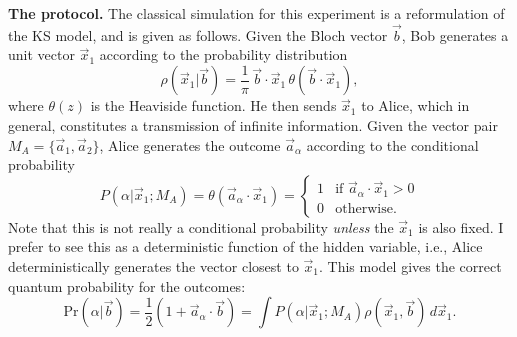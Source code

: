 \documentclass[12pt,draft]{article}
\theoremstyle{definition}
\theoremstyle{plain}
\begin{document}
    \textbf{The protocol.} The classical simulation for this
    experiment is a reformulation of the KS model, and is
    given as follows.  Given the Bloch vector $\vec b$, Bob
    generates a unit vector $\vec x_1$ according to the
    probability distribution
    \begin{equation}
        \rho(\vec x_1 | \vec b)
        = \frac{1}{\pi} \, \vec b \cdot \vec x_1 \,
        \theta(\vec b \cdot \vec x_1),
    \end{equation}
    where $\theta(z)$ is the Heaviside function. He then
    sends $\vec x_1$ to Alice, which in general, constitutes
    a transmission of infinite information. Given the vector
    pair $M_A = \{\vec a_1, \vec a_2\}$, Alice generates the
    outcome $\vec a_\alpha$ according to the conditional
    probability
    \begin{equation}
        P(\alpha | \vec x_1; M_A)
        = \theta(\vec a_\alpha \cdot \vec x_1)
        = \begin{cases}
            1 & \text{if } \vec a_\alpha \cdot \vec x_1 > 0
            \\
            0 & \text{otherwise.}
        \end{cases}
    \end{equation}
    {\color{blue}
        Note that this is not really a conditional
        probability \textit{unless} the $\vec x_1$ is also
        fixed. I prefer to see this as a deterministic
        function of the hidden variable, i.e., Alice
        deterministically generates the vector closest to
    $\vec x_1$.} This model gives the correct quantum
    probability for the outcomes:
    \begin{equation}
        \text{Pr}(\alpha | \vec b)
        = \frac{1}{2} \left( 1 + \vec a_\alpha \cdot \vec b
        \right) 
        = \int P(\alpha | \vec x_1 ; M_A) \rho(\vec
        x_1, \vec b) \, d \vec x_1.
    \end{equation}
\end{document}
